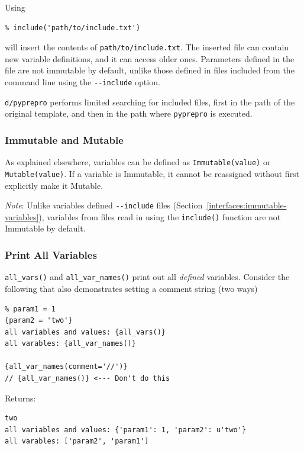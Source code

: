 {Using

\begin{verbatim}
% include('path/to/include.txt')
\end{verbatim}

will insert the contents of
\texttt{\textquotesingle{}path/to/include.txt\textquotesingle{}}. The inserted
file can contain new variable definitions, and it can access older ones.
Parameters defined in the file are not immutable by default, unlike those
defined in files included from the command line using the \texttt{-\/-include} 
option.

\texttt{d/pyprepro} performs limited searching for included files, first
in the path of the original template, and then in the path where 
\texttt{pyprepro} is executed.

\subsubsection{Immutable and Mutable}\label{interfaces:immutable-and-mutable}

As explained elsewhere, variables can be defined as
\texttt{Immutable(value)} or \texttt{Mutable(value)}. If a variable is
Immutable, it cannot be reassigned without first explicitly make it Mutable.

\emph{Note}: Unlike variables defined \texttt{-\/-include} files 
(Section~\ref{interfaces:immutable-variables}), variables from files read in 
using the \texttt{include()} function are not Immutable by default.

\subsubsection{Print All Variables}\label{interfaces:print-all-variables}

\texttt{all\_vars()} and \texttt{all\_var\_names()} print out all
\emph{defined} variables. Consider the following that also demonstrates
setting a comment string (two ways)

\begin{verbatim}
% param1 = 1
{param2 = 'two'}
all variables and values: {all_vars()}
all varables: {all_var_names()}

{all_var_names(comment='//')}
// {all_var_names()} <--- Don't do this
\end{verbatim}

Returns:

\begin{verbatim}
two
all variables and values: {'param1': 1, 'param2': u'two'}
all varables: ['param2', 'param1']


\end{verbatim}}
